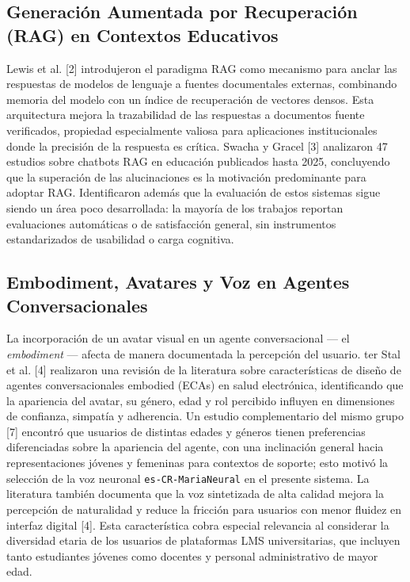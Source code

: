 \documentclass[conference]{IEEEtran}
\begin{document}
\subsection{Generación Aumentada por Recuperación (RAG) en Contextos Educativos}
Lewis et al. [2] introdujeron el paradigma RAG como mecanismo para anclar las respuestas de modelos de lenguaje a fuentes documentales externas, combinando memoria del modelo con un índice de recuperación de vectores densos. Esta arquitectura mejora la trazabilidad de las respuestas a documentos fuente verificados, propiedad especialmente valiosa para aplicaciones institucionales donde la precisión de la respuesta es crítica.
Swacha y Gracel [3] analizaron 47 estudios sobre chatbots RAG en educación publicados hasta 2025, concluyendo que la superación de las alucinaciones es la motivación predominante para adoptar RAG. Identificaron además que la evaluación de estos sistemas sigue siendo un área poco desarrollada: la mayoría de los trabajos reportan evaluaciones automáticas o de satisfacción general, sin instrumentos estandarizados de usabilidad o carga cognitiva.

\subsection{Embodiment, Avatares y Voz en Agentes Conversacionales}

La incorporación de un avatar visual en un agente conversacional --- el \textit{embodiment} --- afecta de manera documentada la percepción del usuario. ter Stal et al. [4] realizaron una revisión de la literatura sobre características de diseño de agentes conversacionales embodied (ECAs) en salud electrónica, identificando que la apariencia del avatar, su género, edad y rol percibido influyen en dimensiones de confianza, simpatía y adherencia. Un estudio complementario del mismo grupo [7] encontró que usuarios de distintas edades y géneros tienen preferencias diferenciadas sobre la apariencia del agente, con una inclinación general hacia representaciones jóvenes y femeninas para contextos de soporte; esto motivó la selección de la voz neuronal \texttt{es-CR-MariaNeural} en el presente sistema.
La literatura también documenta que la voz sintetizada de alta calidad mejora la percepción de naturalidad y reduce la fricción para usuarios con menor fluidez en interfaz digital [4]. Esta característica cobra especial relevancia al considerar la diversidad etaria de los usuarios de plataformas LMS universitarias, que incluyen tanto estudiantes jóvenes como docentes y personal administrativo de mayor edad.
\end{document}
